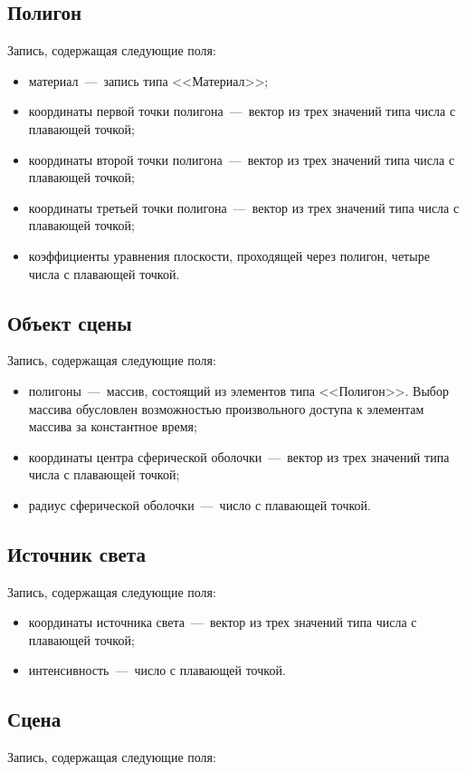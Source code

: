 \subsection{Полигон}
Запись, содержащая следующие поля:

\begin{itemize}
	\item материал~---~запись типа <<Материал>>;
	\item координаты первой точки полигона~---~вектор из трех значений типа числа с плавающей точкой;
	\item координаты второй точки полигона~---~вектор из трех значений типа числа с плавающей точкой;
	\item координаты третьей точки полигона~---~вектор из трех значений типа числа с плавающей точкой;
	\item коэффициенты уравнения плоскости, проходящей через полигон, четыре числа с плавающей точкой.
\end{itemize}

\subsection{Объект сцены}
Запись, содержащая следующие поля:

\begin{itemize}
	\item полигоны~---~массив, состоящий из элементов типа <<Полигон>>. Выбор массива обусловлен возможностью произвольного доступа к элементам массива за константное время;
	\item координаты центра сферической оболочки~---~вектор из трех значений типа числа с плавающей точкой;
	\item радиус сферической оболочки~---~число с плавающей точкой.
\end{itemize}

\subsection{Источник света}
Запись, содержащая следующие поля:

\begin{itemize}
	\item координаты источника света~---~вектор из трех значений типа числа с плавающей точкой;
	\item интенсивность~---~число с плавающей точкой.
\end{itemize}

\subsection{Сцена}
Запись, содержащая следующие поля:

